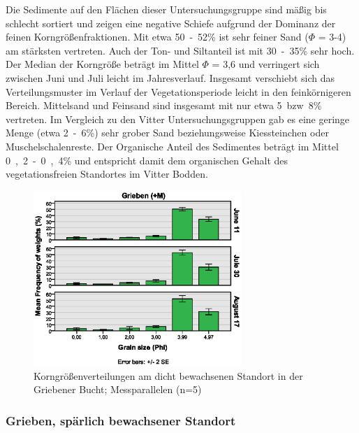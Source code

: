 Die Sedimente auf den Flächen dieser Untersuchungsgruppe sind mäßig bis schlecht sortiert und zeigen eine negative Schiefe aufgrund der Dominanz der feinen Korngrößenfraktionen. Mit etwa \unit{50-52}{\%} ist sehr feiner Sand ($\Phi$ = 3-4) am stärksten vertreten. Auch der Ton- und Siltanteil ist mit \unit{30-35}{\%} sehr hoch. Der Median der Korngröße beträgt im Mittel $\Phi$ = 3,6 und verringert sich zwischen Juni und Juli leicht im Jahresverlauf. Insgesamt verschiebt sich das Verteilungsmuster im Verlauf der Vegetationsperiode leicht in den feinkörnigeren Bereich. Mittelsand und Feinsand sind insgesamt mit nur etwa \unit{5 bzw 8}{\%} vertreten. Im Vergleich zu den Vitter Untersuchungsgruppen gab es eine geringe Menge (etwa \unit{2-6}{\%}) sehr grober Sand beziehungsweise Kiessteinchen oder Muschelschalenreste. 
Der Organische Anteil des Sedimentes beträgt im Mittel \unit{0,2-0,4}{\%} und entspricht damit dem organischen Gehalt des vegetationsfreien Standortes im Vitter Bodden.



\begin{figure}[!htb]
\centering
\includegraphics[width=0.70\textwidth]{images/grainsize/sediment_im_jahr3.eps}
\caption[Korngrößenverteilungen Grieben (+M)]{Korngrößenverteilungen am dicht bewachsenen Standort in der Griebener Bucht; Messparallelen (n=5)}
\label{fig:korngrössen_Grieben_+m}
\end{figure}




\subsubsection{Grieben, spärlich bewachsener Standort}

